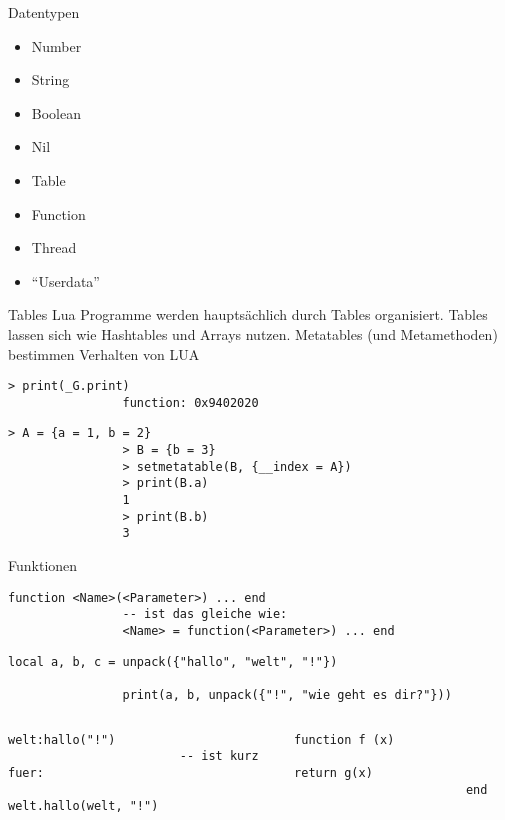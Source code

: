 \documentclass{beamer}
\begin{document}
		\begin{frame}{Datentypen}
			\begin{itemize}
				\item Number
				\item String
				\item Boolean
				\item Nil
				\item Table
				\item Function
				\item Thread
				\item "`Userdata"'
			\end{itemize}
		\end{frame}
		
		\begin{frame}[fragile,shrink=5]{Tables}
			Lua Programme werden hauptsächlich durch Tables organisiert.
			Tables lassen sich wie Hashtables und Arrays nutzen.
			Metatables (und Metamethoden) bestimmen Verhalten von LUA
			\begin{lstlisting}[title={\_G}]
				> print(_G.print)
				function: 0x9402020
			\end{lstlisting}

			\begin{lstlisting}[title={\_\_index}]
				> A = {a = 1, b = 2}
				> B = {b = 3}
				> setmetatable(B, {__index = A})
				> print(B.a)
				1
				> print(B.b)
				3
			\end{lstlisting}
		\end{frame}
		
		\begin{frame}[fragile,shrink=5]{Funktionen}
			\lstset{numbers=none}
			\begin{lstlisting}[title={Schreibweise}]
				function <Name>(<Parameter>) ... end
				-- ist das gleiche wie:
				<Name> = function(<Parameter>) ... end
			\end{lstlisting}

			\begin{lstlisting}[title={Mehrere Rückgabewerte}]
				local a, b, c = unpack({"hallo", "welt", "!"})

				print(a, b, unpack({"!", "wie geht es dir?"}))
			\end{lstlisting}
			
			\begin{columns}
					\begin{lstlisting}[title={OOP}]
						welt:hallo("!")
						-- ist kurz fuer:
						welt.hallo(welt, "!")
					\end{lstlisting}
				
					\begin{lstlisting}[title={Proper Tail Calls}]
						function f (x)
						  return g(x)
						end
					\end{lstlisting}
			\end{columns}
		\end{frame}
		
\end{document}
